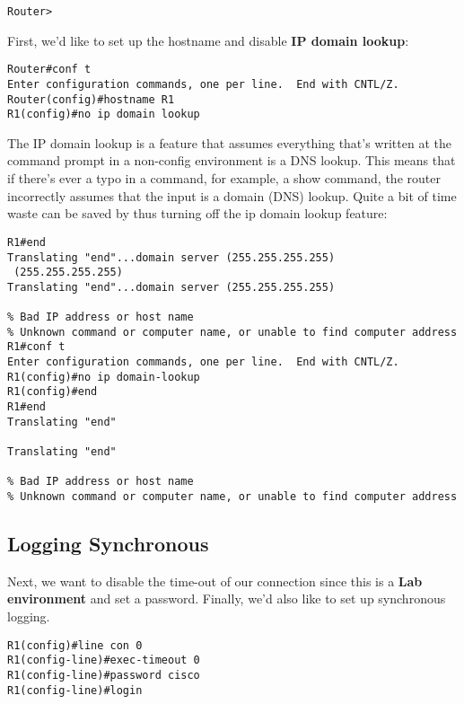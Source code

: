 \vspace{-15pt}
\begin{verbatim}
Router>
\end{verbatim}
\vspace{-10pt}

\noindent
First, we'd like to set up the hostname and disable \textbf{IP domain lookup}:

\vspace{-15pt}
\begin{verbatim}
Router#conf t
Enter configuration commands, one per line.  End with CNTL/Z.
Router(config)#hostname R1
R1(config)#no ip domain lookup
\end{verbatim}
\vspace{-10pt}

\noindent
The IP domain lookup is a feature that assumes everything that's written at the command prompt in a non-config environment is a DNS lookup. This means that if there's ever a typo in a command, for example, a show command, the router incorrectly assumes that the input is a domain (DNS) lookup. Quite a bit of time waste can be saved by thus turning off the ip domain lookup feature:

\vspace{-15pt}
\begin{verbatim}
R1#end
Translating "end"...domain server (255.255.255.255)
 (255.255.255.255)
Translating "end"...domain server (255.255.255.255)

% Bad IP address or host name
% Unknown command or computer name, or unable to find computer address
R1#conf t
Enter configuration commands, one per line.  End with CNTL/Z.
R1(config)#no ip domain-lookup
R1(config)#end
R1#end
Translating "end"

Translating "end"

% Bad IP address or host name
% Unknown command or computer name, or unable to find computer address
\end{verbatim}
\vspace{-10pt}

\subsection{Logging Synchronous}
Next, we want to disable the time-out of our connection since this is a \textbf{Lab environment} and set a password. Finally, we'd also like to set up synchronous logging. 

\vspace{-15pt}
\begin{verbatim}
R1(config)#line con 0
R1(config-line)#exec-timeout 0
R1(config-line)#password cisco
R1(config-line)#login
\end{verbatim}
\vspace{-10pt}

